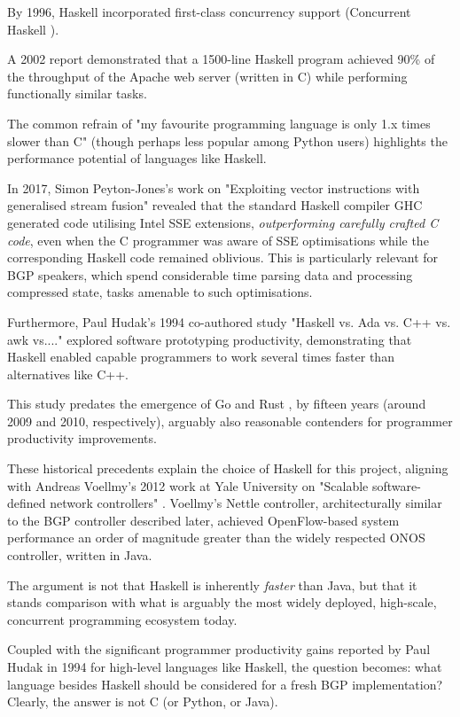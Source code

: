 By 1996, Haskell incorporated first-class concurrency support (Concurrent Haskell \cite{concurrenthaskell}).

A 2002 report\cite{marlow2002} demonstrated that a 1500-line Haskell program achieved 90\% of the throughput of the Apache web server (written in C) while performing functionally similar tasks.

\smallskip

The common refrain of "my favourite programming language is only 1.x times slower than C" (though perhaps less popular among Python users) highlights the performance potential of languages like Haskell.

In 2017, Simon Peyton-Jones's work on "Exploiting vector instructions with generalised stream fusion"\cite{spj2017} revealed that the standard Haskell compiler GHC generated code utilising Intel SSE extensions, \textit{outperforming carefully crafted C code}, even when the C programmer was aware of SSE optimisations while the corresponding Haskell code remained oblivious. This is particularly relevant for BGP speakers, which spend considerable time parsing data and processing compressed state, tasks amenable to such optimisations.

Furthermore, Paul Hudak's 1994 co-authored study "Haskell vs. Ada vs. C++ vs. awk vs...." \cite{hudak1994}explored software prototyping productivity, demonstrating that Haskell enabled capable programmers to work several times faster than alternatives like C++.

This study predates the emergence of Go \cite{golang} and Rust \cite{rust}, by fifteen years (around 2009 and 2010, respectively), arguably also reasonable contenders for programmer productivity improvements.

These historical precedents explain the choice of Haskell for this project, aligning with Andreas Voellmy's 2012 work at Yale University on "Scalable software-defined network controllers" \cite{mcnettle}. Voellmy's Nettle controller, architecturally similar to the BGP controller described later, achieved OpenFlow-based system performance an order of magnitude greater than the widely respected ONOS controller, written in Java.

The argument is not that Haskell is inherently \textit{faster} than Java, but that it stands comparison with what is arguably the most widely deployed, high-scale, concurrent programming ecosystem today.

Coupled with the significant programmer productivity gains reported by Paul Hudak in 1994 for high-level languages like Haskell, the question becomes: what language besides Haskell should be considered for a fresh BGP implementation? Clearly, the answer is not C (or Python, or Java).

